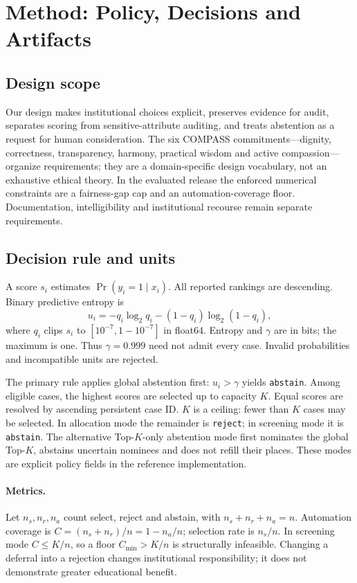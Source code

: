 \section{Method: Policy, Decisions and Artifacts}
\label{sec:method}
\subsection{Design scope}
Our design makes institutional choices explicit, preserves evidence for audit, separates scoring from sensitive-attribute auditing, and treats abstention as a request for human consideration. The six COMPASS commitments---dignity, correctness, transparency, harmony, practical wisdom and active compassion---organize requirements; they are a domain-specific design vocabulary, not an exhaustive ethical theory. In the evaluated release the enforced numerical constraints are a fairness-gap cap and an automation-coverage floor. Documentation, intelligibility and institutional recourse remain separate requirements.

\subsection{Decision rule and units}
\label{sec:decision-rule}
A score $s_i$ estimates $\Pr(y_i=1\mid x_i)$. All reported rankings are descending. Binary predictive entropy is
\begin{equation}
 u_i=-q_i\log_2q_i-(1-q_i)\log_2(1-q_i),
\end{equation}
where $q_i$ clips $s_i$ to $[10^{-7},1-10^{-7}]$ in float64. Entropy and $\gamma$ are in bits; the maximum is one. Thus $\gamma=0.999$ need not admit every case. Invalid probabilities and incompatible units are rejected.

The primary rule applies global abstention first: $u_i>\gamma$ yields \texttt{abstain}. Among eligible cases, the highest scores are selected up to capacity $K$. Equal scores are resolved by ascending persistent case ID. $K$ is a ceiling: fewer than $K$ cases may be selected. In allocation mode the remainder is \texttt{reject}; in screening mode it is \texttt{abstain}. The alternative Top-$K$-only abstention mode first nominates the global Top-$K$, abstains uncertain nominees and does not refill their places. These modes are explicit policy fields in the reference implementation.



\paragraph{Metrics.}
Let $n_s,n_r,n_a$ count select, reject and abstain, with $n_s+n_r+n_a=n$. Automation coverage is $C=(n_s+n_r)/n=1-n_a/n$; selection rate is $n_s/n$. In screening mode $C\leq K/n$, so a floor $C_{\min}>K/n$ is structurally infeasible. Changing a deferral into a rejection changes institutional responsibility; it does not demonstrate greater educational benefit.

